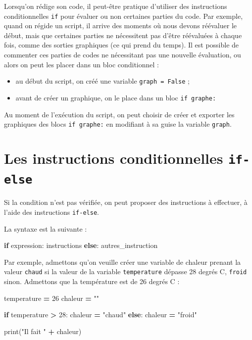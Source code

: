 \documentclass[
  12pt,
]{book}
\newenvironment{Shaded}{\begin{snugshade}}{\end{snugshade}}
\newcommand{\BuiltInTok}[1]{#1}
\newcommand{\ControlFlowTok}[1]{\textcolor[rgb]{0.13,0.29,0.53}{\textbf{#1}}}
\newcommand{\DecValTok}[1]{\textcolor[rgb]{0.00,0.00,0.81}{#1}}
\newcommand{\NormalTok}[1]{#1}
\newcommand{\OperatorTok}[1]{\textcolor[rgb]{0.81,0.36,0.00}{\textbf{#1}}}
\newcommand{\StringTok}[1]{\textcolor[rgb]{0.31,0.60,0.02}{#1}}
\providecommand{\tightlist}{%
  \setlength{\itemsep}{0pt}\setlength{\parskip}{0pt}}
\numberwithin{equation}{section}
\newcounter{countremarque}
\newenvironment{remarque}{%
 \refstepcounter{countremarque}
    \begin{tcolorbox}[width=\linewidth, colback=blue!3, boxrule=0.5pt,arc=0pt,title = Remarque \thecountremarque]
    }%
    {
    \end{tcolorbox}
    }
\numberwithin{countremarque}{section}
\begin{document}
\begin{remarque}
Lorsqu'on rédige son code, il peut-être pratique d'utiliser des instructions conditionnelles \texttt{if} pour évaluer ou non certaines parties du code. Par exemple, quand on régide un script, il arrive des moments où nous devons réévaluer le début, mais que certaines parties ne nécessitent pas d'être réévaluées à chaque fois, comme des sorties graphiques (ce qui prend du temps). Il est possible de commenter ces parties de codes ne nécessitant pas une nouvelle évaluation, ou alors on peut les placer dans un bloc conditionnel :

\begin{itemize}
\tightlist
\item
  au début du script, on créé une variable \texttt{graph\ =\ False} ;
\item
  avant de créer un graphique, on le place dans un bloc \texttt{if\ graphe:}
\end{itemize}

Au moment de l'exécution du script, on peut choisir de créer et exporter les graphiques des blocs \texttt{if\ graphe:} en modifiant à sa guise la variable \texttt{graph}.
\end{remarque}

\section{\texorpdfstring{Les instructions conditionnelles \texttt{if-else}}{Les instructions conditionnelles if-else}}\label{les-instructions-conditionnelles-if-else}

Si la condition n'est pas vérifiée, on peut proposer des instructions à effectuer, à l'aide des instructions \texttt{if-else}.

La syntaxe est la suivante :

\begin{Shaded}
\begin{Highlighting}[]
\ControlFlowTok{if}\NormalTok{ expression:}
\NormalTok{  instructions}
\ControlFlowTok{else}\NormalTok{:}
\NormalTok{  autres\_instruction}
\end{Highlighting}
\end{Shaded}

Par exemple, admettons qu'on veuille créer une variable de chaleur prenant la valeur \texttt{chaud} si la valeur de la variable \texttt{temperature} dépasse 28 degrés C, \texttt{froid} sinon. Admettons que la température est de 26 degrés C :

\begin{Shaded}
\begin{Highlighting}[]
\NormalTok{temperature }\OperatorTok{=} \DecValTok{26}
\NormalTok{chaleur }\OperatorTok{=} \StringTok{""}

\ControlFlowTok{if}\NormalTok{ temperature }\OperatorTok{\textgreater{}} \DecValTok{28}\NormalTok{:}
\NormalTok{  chaleur }\OperatorTok{=} \StringTok{"chaud"}
\ControlFlowTok{else}\NormalTok{:}
\NormalTok{  chaleur }\OperatorTok{=} \StringTok{"froid"}

\BuiltInTok{print}\NormalTok{(}\StringTok{"Il fait "} \OperatorTok{+}\NormalTok{ chaleur)}
\end{Highlighting}
\end{Shaded}
\end{document}
